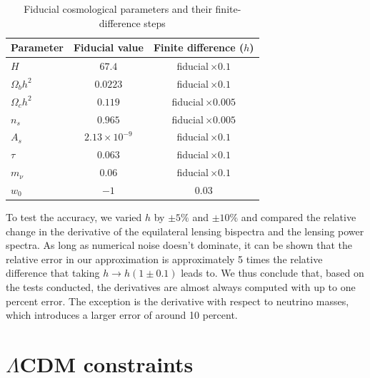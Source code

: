 \documentclass[11pt]{article} %
\begin{document}
\begin{table}[h!]
    \centering
    \begin{tabular}{|l|c|c|}
    \hline
    Parameter & Fiducial value & Finite difference ($h$) \\
    \hline
    $H$            & $67.4$               & fiducial\,$\times0.1$   \\
    $\Omega_b h^2$ & $0.0223$             & fiducial\,$\times0.1$   \\
    $\Omega_c h^2$ & $0.119$              & fiducial\,$\times0.005$ \\
    $n_s$          & $0.965$              & fiducial\,$\times0.005$ \\
    $A_s$          & $2.13\times10^{-9}$  & fiducial\,$\times0.1$   \\
    $\tau$         & $0.063$              & fiducial\,$\times 0.1$   \\
    $m_\nu$        & $0.06$               & fiducial\,$\times0.1$   \\
    $w_0$          & $-1$                 & $0.03$                  \\
    \hline
    \end{tabular}
    \caption{Fiducial cosmological parameters and their finite-difference steps}
    \label{tab:cosmo-params-diff}
\end{table}
    
    

To test the accuracy, we varied $h$ by $\pm 5\%$ and $\pm 10\%$ and compared the relative change in the derivative of the equilateral lensing bispectra and the lensing power spectra. As long as numerical noise doesn't dominate, it can be shown that the relative error in our approximation is approximately 5 times the relative difference that taking $h \rightarrow h(1 \pm 0.1)$ leads to. We thus conclude that, based on the tests conducted, the derivatives are almost always computed with up to one percent error. The exception is the derivative with respect to neutrino masses, which introduces a larger error of around 10 percent.

\pagebreak
\section{$\Lambda$CDM constraints}
\label{sec:lambdacdmconstraints}
\end{document}
